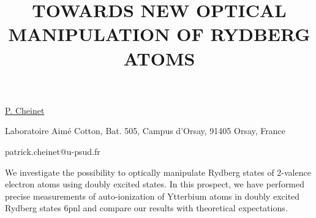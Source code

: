 \title{TOWARDS NEW OPTICAL MANIPULATION OF RYDBERG ATOMS}

\underline{P. Cheinet} 

{\normalsize{\vspace{-4mm}
Laboratoire Aim\'e Cotton,
Bat. 505, Campus d'Orsay,
91405 Orsay,
France



\email patrick.cheinet@u-psud.fr}}

We investigate the possibility to optically manipulate Rydberg states of 2-valence electron atoms using doubly excited states. In this prospect, we have performed precise measurements of auto-ionization of Ytterbium atoms in doubly excited Rydberg states 6pnl and compare our results with theoretical expectations.

\vspace{\baselineskip} 